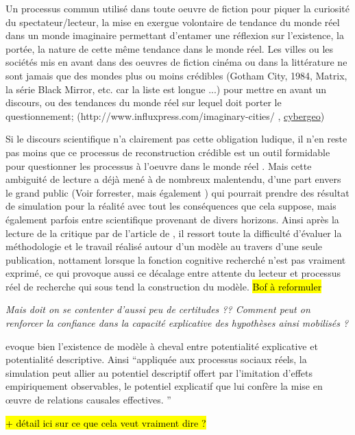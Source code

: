 Un processus commun utilisé dans toute oeuvre de fiction pour piquer la curiosité du spectateur/lecteur, la mise en exergue volontaire de tendance du monde réel dans un monde imaginaire permettant d'entamer une réflexion sur l'existence, la portée, la nature de cette même tendance dans le monde réel. Les villes ou les sociétés mis en avant dans des oeuvres de fiction cinéma ou dans la littérature ne sont jamais que des mondes plus ou moins crédibles (Gotham City, 1984, Matrix, la série Black Mirror, etc. car la liste est longue ...)  pour mettre en avant un discours, ou des tendances du monde réel sur lequel doit porter le questionnement; (http://www.influxpress.com/imaginary-cities/ ,  \href{http://cybergeo.revues.org/1170#tocto1n9?}{cybergeo})

Si le discours scientifique n'a clairement pas cette obligation ludique, il n'en reste pas moins que ce processus de reconstruction crédible est un outil formidable pour questionner les processus à l'oeuvre dans le monde réel . Mais cette ambiguité de lecture a déjà mené à de nombreux malentendu, d'une part envers le grand public (Voir forrester, mais également ) qui pourrait prendre des résultat de simulation pour la réalité avec tout les conséquences que cela suppose, mais également parfois entre scientifique provenant de divers horizons. Ainsi après la lecture de la critique par \textcite{Chattoe2011} de l'article de \textcite{Yanoff2009}, il ressort toute la difficulté d'évaluer la méthodologie et le travail réalisé autour d'un modèle au travers d'une seule publication, nottament lorsque la fonction cognitive recherché n'est pas vraiment exprimé, ce qui provoque aussi ce décalage entre attente du lecteur et processus réel de recherche qui sous tend la construction du modèle. \hl{Bof à reformuler}


\textit{Mais doit on se contenter d'aussi peu de certitudes ?? Comment peut on renforcer la confiance dans la capacité explicative des hypothèses ainsi mobilisés ? }

\textcite{Bulle2005} evoque bien l'existence de modèle à cheval entre potentialité explicative et potentialité descriptive. Ainsi \enquote{appliquée aux processus sociaux réels, la simulation peut allier au potentiel descriptif offert par l’imitation d’effets empiriquement observables, le potentiel explicatif que lui confère la mise en œuvre de relations causales effectives. }

\hl{+ détail ici sur ce que cela veut vraiment dire ? }

